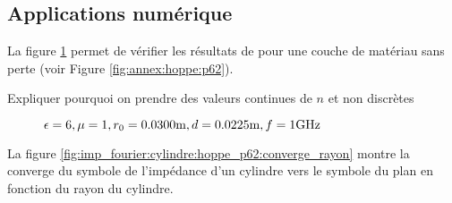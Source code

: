     \subsection{Applications numérique}

        La figure \ref{fig:imp_fourier:cylindre:hoppe_p62} permet de vérifier les résultats de \cite[p.~62]{hoppe_impedance_1995} pour une couche de matériau sans perte (voir Figure \ref{fig:annex:hoppe:p62}).

        \begin{TODO}
  Expliquer pourquoi on prendre des valeurs continues de \(n\) et non discrètes
\end{TODO}

        \begin{figure}[!hbt]
            \centering
            \caption{\(\epsilon = 6, \mu = 1, r_0 = 0.0300\text{m}, d=0.0225\text{m}, f=1\text{GHz}\)}
            \label{fig:imp_fourier:cylindre:hoppe_p62}
        \end{figure}
        
        La figure \ref{fig:imp_fourier:cylindre:hoppe_p62:converge_rayon} montre la converge du symbole de l'impédance d'un cylindre vers le symbole du plan en fonction du rayon du cylindre.

